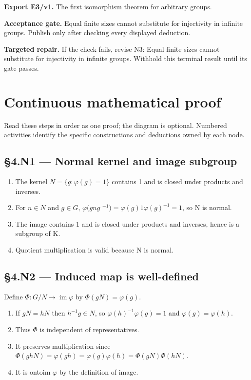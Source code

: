 \documentclass[preprint,12pt,aps,pra,showkeys,amsmath,amssymb,superscriptaddress,floatfix]{revtex4-2}
\theoremstyle{definition}
\theoremstyle{remark}
\newcommand{\field}[2]{\par\smallskip\noindent\textbf{#1.} #2\par}
\begin{document}
\field{Export E3/v1}{The first isomorphism theorem for arbitrary groups.}

\field{Acceptance gate}{Equal finite sizes cannot substitute for injectivity in infinite groups.
Publish only after checking every displayed deduction.}

\field{Targeted repair}{If the check fails, revise N3: Equal finite sizes cannot substitute for
injectivity in infinite groups. Withhold this terminal result until its
gate passes.}

\endgroup\clearpage\section{Continuous mathematical proof}\label{sec:proof}

Read these steps in order as one proof; the diagram is optional.
Numbered activities identify the specific constructions and deductions
owned by each node.

\subsection{§4.N1 --- Normal kernel and image
subgroup}\label{n1-normal-kernel-and-image-subgroup}

\begin{enumerate}
\def\labelenumi{\arabic{enumi}.}
\item
  The kernel \(N=\{g:\varphi (g)=1\}\) contains 1 and is closed under
  products and inverses.
\item
  For \(n\in N\) and \(g\in G\), \(\varphi (gng\)
  \(^{-1})=\varphi (g)1\varphi (g)^{-1}=1\), so N is normal.
\item
  The image contains 1 and is closed under products and inverses, hence
  is a subgroup of K.
\item
  Quotient multiplication is valid because N is normal.
\end{enumerate}

\subsection{§4.N2 --- Induced map is
well-defined}\label{n2-induced-map-is-well-defined}

Define \(\Phi:G/N\to\operatorname{im}\varphi\) by
\(\Phi(gN)=\varphi(g)\).

\begin{enumerate}
\def\labelenumi{\arabic{enumi}.}
\item
  If \(gN=hN\) then \(h^{-1}g\in N\), so
  \(\varphi (h)^{-1}\varphi (g)=1\) and \(\varphi (g)=\varphi (h)\).
\item
  Thus \(\Phi\) is independent of representatives.
\item
  It preserves multiplication since
  \(\Phi (ghN)=\varphi (gh)=\varphi (g)\varphi (h)=\Phi (gN)\Phi (hN)\).
\item
  It is ontoim \(\varphi\) by the definition of image.
\end{enumerate}
\end{document}
